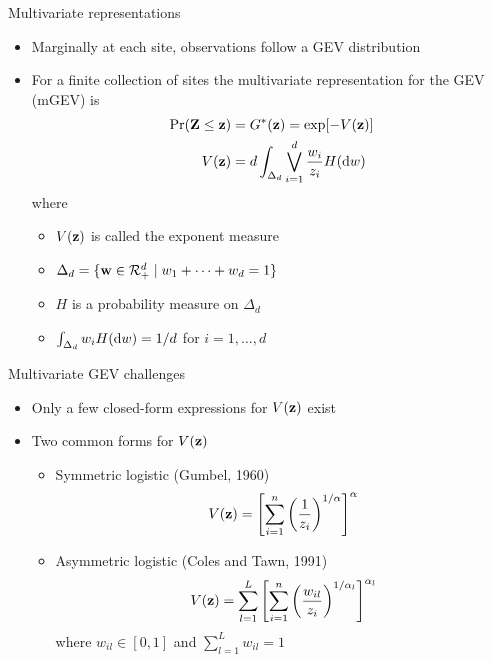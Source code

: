 \documentclass{beamer}
\begin{document}
\begin{frame}{Multivariate representations}
  \begin{itemize} \setlength{\itemsep}{1em}
    \item Marginally at each site, observations follow a GEV distribution
    \item For a finite collection of sites the multivariate representation for the GEV (mGEV) is
    \begin{align*}
      \Pr(\mbox{\bf Z} \le \mbox{\bf z})  &= G^*(\mbox{\bf z}) = \exp[-V(\mbox{\bf z})]\\
            V(\mbox{\bf z})    &= d \int_{\Delta_d} \bigvee_{i = 1}^d \frac{w_i}{z_i} H(\text{d} w)
    \end{align*}
    where
    \begin{itemize} \setlength{\itemsep}{0.25em}
      \item $V(\mbox{\bf z})$ is called the exponent measure
      \item $\Delta_d = \{ \mbox{\bf w} \in {\cal R}^d_+ \mid w_1 + \cdots + w_d = 1\}$
      \item $H$ is a probability measure on $\Delta_d$
      \item $\int_{\Delta_d}w_i H(\text{d} w) = 1 / d$ for $i = 1, \ldots, d$
    \end{itemize}
  \end{itemize}
\end{frame}

\begin{frame}{Multivariate GEV challenges}
  \begin{itemize} \setlength{\itemsep}{1em}
    \item Only a few closed-form expressions for $V(\mbox{\bf z})$ exist
    \item Two common forms for $V(\mbox{\bf z})$
    \begin{itemize}
      \item Symmetric logistic (Gumbel, 1960)
      \begin{align*}
        V(\mbox{\bf z}) = \left[\sum_{i = 1}^n \left( \frac{ 1 }{ z_i } \right)^{1/\alpha}\right]^\alpha
      \end{align*}
      \item Asymmetric logistic (Coles and Tawn, 1991)
      \begin{align*}
        V(\mbox{\bf z}) = \sum_{l = 1}^L \left[\sum_{i = 1}^n \left(\frac{w_{il}}{z_i} \right)^{1 / \alpha_l} \right]^{\alpha_l}
      \end{align*}
      where $w_{il} \in [0, 1]$ and $\sum_{l = 1}^L w_{il} = 1$
    \end{itemize}
  \end{itemize}
\end{frame}
\end{document}
